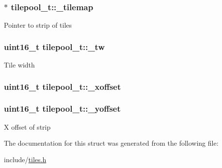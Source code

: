 \subsubsection[{\texorpdfstring{\+\_\+tilemap}{\_tilemap}}]{$\ast$ tilepool\+\_\+t\+::\+\_\+tilemap}\hypertarget{structtilepool__t_a2bb67a7343217713e040b5b226b7dd32}{}\label{structtilepool__t_a2bb67a7343217713e040b5b226b7dd32}
Pointer to strip of tiles 
\subsubsection[{\texorpdfstring{\+\_\+tw}{\_tw}}]{\setlength{\rightskip}{0pt plus 5cm}uint16\+\_\+t tilepool\+\_\+t\+::\+\_\+tw}\hypertarget{structtilepool__t_af3e69db6b6fc3ea8a1cfbe57a7f03331}{}\label{structtilepool__t_af3e69db6b6fc3ea8a1cfbe57a7f03331}
Tile width 
\subsubsection[{\texorpdfstring{\+\_\+xoffset}{\_xoffset}}]{\setlength{\rightskip}{0pt plus 5cm}uint16\+\_\+t tilepool\+\_\+t\+::\+\_\+xoffset}\hypertarget{structtilepool__t_aa13b342aa0f301e0d9b160e17a1e23d8}{}\label{structtilepool__t_aa13b342aa0f301e0d9b160e17a1e23d8}
\subsubsection[{\texorpdfstring{\+\_\+yoffset}{\_yoffset}}]{\setlength{\rightskip}{0pt plus 5cm}uint16\+\_\+t tilepool\+\_\+t\+::\+\_\+yoffset}\hypertarget{structtilepool__t_a3d49b78c34fd815960055061dc4e3086}{}\label{structtilepool__t_a3d49b78c34fd815960055061dc4e3086}
X offset of strip 

The documentation for this struct was generated from the following file\+:\begin{DoxyCompactItemize}
\item 
include/\hyperlink{tiles_8h}{tiles.\+h}\end{DoxyCompactItemize}
